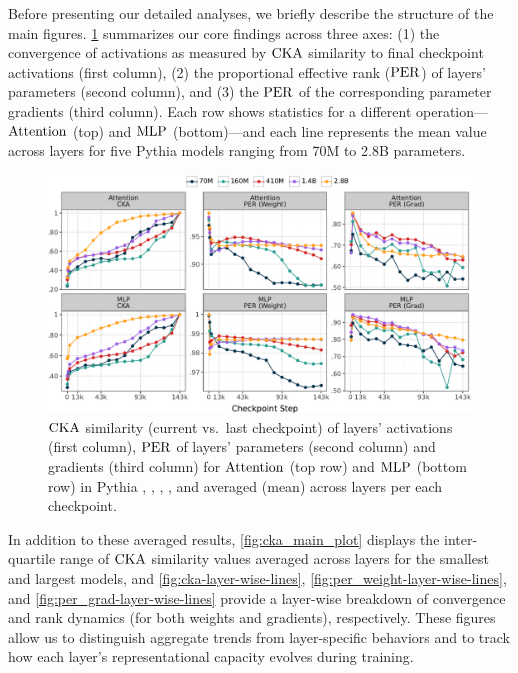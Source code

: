 Before presenting our detailed analyses, we briefly describe the structure of the main figures. \cref{fig:main-results} summarizes our core findings across three axes: (1) the convergence of activations as measured by $\mathrm{CKA}$ similarity to final checkpoint activations (first column), (2) the proportional effective rank ($\mathrm{PER}$) of layers' parameters (second column), and (3) the $\mathrm{PER}$ of the corresponding parameter gradients (third column). Each row shows statistics for a different operation—$\mathrm{Attention}$ (top) and $\mathrm{MLP}$ (bottom)—and each line represents the mean value across layers for five Pythia models ranging from 70M to 2.8B parameters.


\begin{figure}[h!]
    \centering
    \includegraphics[width=\linewidth]{chapters/tending-towards-stability/figures/results.pdf}
    \vspace{-15pt}
    \caption{$\mathrm{CKA}$ similarity (current vs.\ last checkpoint) of layers' activations (first column), $\mathrm{PER}$ of layers' parameters (second column) and gradients (third column) for $\mathrm{Attention}$ (top row) and $\mathrm{MLP}$ (bottom row) in Pythia \sevenmil, \sixmil, \fourmil, \onebil, and \twobil averaged (mean) across layers per each checkpoint.}
    \label{fig:main-results}
\end{figure}



In addition to these averaged results, \cref{fig:cka_main_plot} displays the inter-quartile range of $\mathrm{CKA}$ similarity values averaged across layers for the smallest and largest models, and \cref{fig:cka-layer-wise-lines}, \cref{fig:per_weight-layer-wise-lines}, and \cref{fig:per_grad-layer-wise-lines} provide a layer-wise breakdown of convergence and rank dynamics (for both weights and gradients), respectively. These figures allow us to distinguish aggregate trends from layer-specific behaviors and to track how each layer's representational capacity evolves during training.


